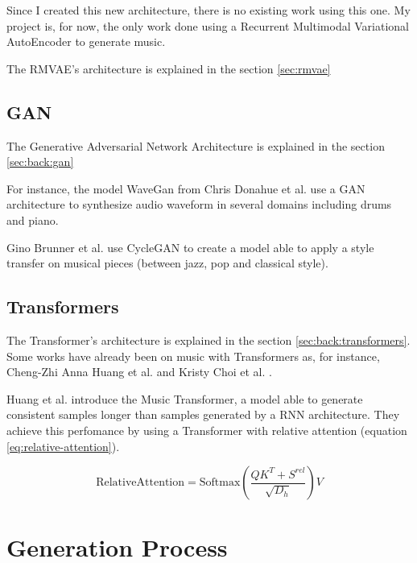\documentclass[12pt]{report}
\begin{document}

Since I created this new architecture, there is no existing work using this one.
My project is, for now, the only work done using a Recurrent Multimodal Variational AutoEncoder to generate music.

The RMVAE's architecture is explained in the section \ref{sec:rmvae}

\subsection{GAN}

The Generative Adversarial Network Architecture is explained in the section \ref{sec:back:gan}

For instance, the model WaveGan from Chris Donahue et al. \cite{donahue_adversarial_2019} use a GAN architecture to synthesize audio waveform in several domains including drums and piano.

Gino Brunner et al. \cite{brunner_symbolic_2018} use CycleGAN \cite{zhu_unpaired_2018} to create a model able to apply a style transfer on musical pieces (between jazz, pop and classical style).

\subsection{Transformers}

The Transformer's architecture is explained in the section \ref{sec:back:transformers}.
Some works have already been on music with Transformers as, for instance, Cheng-Zhi Anna Huang et al. \cite{huang_music_2018} and Kristy Choi et al. \cite{choi_encoding_2019}.

Huang et al. introduce the Music Transformer, a model able to generate consistent samples longer than samples generated by a RNN architecture.
They achieve this perfomance by using a Transformer with relative attention (equation \ref{eq:relative-attention}).

\begin{equation}
    \text{RelativeAttention} = \text{Softmax} (\frac{QK^T + S^{rel}}{\sqrt{D_h}})V
    \label{eq:relative-attention}
\end{equation}

\section{Generation Process}
\label{sec:related-works:generation-process}
\end{document}
